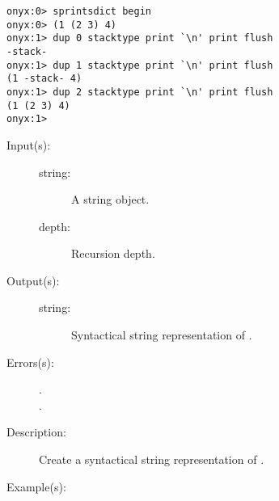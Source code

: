 \begin{description}
\begin{description}
\begin{verbatim}
onyx:0> sprintsdict begin
onyx:0> (1 (2 3) 4)
onyx:1> dup 0 stacktype print `\n' print flush
-stack-
onyx:1> dup 1 stacktype print `\n' print flush
(1 -stack- 4)
onyx:1> dup 2 stacktype print `\n' print flush
(1 (2 3) 4)
onyx:1>
		\end{verbatim}
	\end{description}
\label{sprintsdict:stringtype}
\item[{\onyxop{string depth}{stringtype}{string}}: ]
	\begin{description}\item[]
	\item[Input(s): ]
		\begin{description}\item[]
		\item[string: ]
			A string object.
		\item[depth: ]
			Recursion depth.
		\end{description}
	\item[Output(s): ]
		\begin{description}\item[]
		\item[string: ]
			Syntactical string representation of .
		\end{description}
	\item[Errors(s): ]
		\begin{description}\item[]
		\item[.]
		\item[.]
		\end{description}
	\item[Description: ]
		Create a syntactical string representation of .
	\item[Example(s): ]\begin{verbatim}


\end{verbatim}
\end{description}
\end{description}
